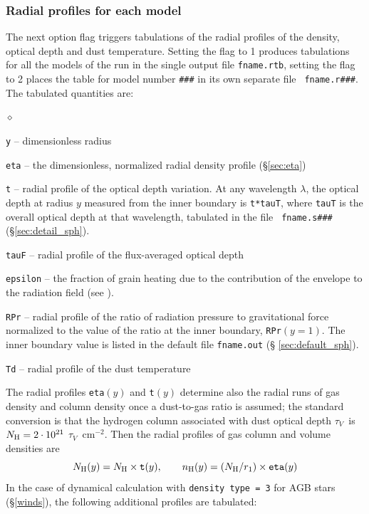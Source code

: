 \documentclass[11pt]{article}
\def\E#1{\hbox{$10^{#1}$}}
\def\tV     {\hbox{$\tau_V$}}
\begin{document}
\subsubsection{Radial profiles for each model}
\label{sec:radial_sph}

The next option flag triggers tabulations of the radial profiles of
the density, optical depth and dust temperature. Setting the flag to 1
produces tabulations for all the models of the run in the single
output file {\tt fname.rtb}, setting the flag to 2 places the table
for model number {\tt \#\#\#} in its own separate file {\tt
  fname.r\#\#\#}. The tabulated quantities are:

\begin{list}{$\diamond$}{}
\item{\tt y} -- dimensionless radius
\item{\tt eta} -- the dimensionless, normalized radial density profile
  (\S \ref{sec:eta})
\item {\tt t} -- radial profile of the optical depth variation.  At
  any wavelength $\lambda$, the optical depth at radius $y$ measured
  from the inner boundary is {\tt t*tauT}, where {\tt tauT} is the
  overall optical depth at that wavelength, tabulated in the file {\tt
    fname.s\#\#\#} (\S \ref{sec:detail_sph}).

\item{\tt tauF} -- radial profile of the flux-averaged optical depth
\item {\tt epsilon} -- the fraction of grain heating due to the
  contribution of the envelope to the radiation field (see
  \cite{IE97}).
\item{\tt RPr} -- radial profile of the ratio of radiation pressure to
  gravitational force normalized to the value of the ratio at the
  inner boundary, {\tt RPr$(y = 1)$}. The inner boundary value is
  listed in the default file {\tt fname.out} (\S
  \ref{sec:default_sph}).
\item{\tt Td} -- radial profile of the dust temperature

\end{list}
The radial profiles {\tt eta}$(y)$ and {\tt t}$(y)$ determine also the
radial runs of gas density and column density once a dust-to-gas ratio
is assumed; the standard conversion is that the hydrogen column
associated with dust optical depth \tV\ is $N_{\rm H} = 2\cdot\E{21}$
\tV\ cm$^{-2}$. Then the radial profiles of gas column and volume
densities are
\begin{equation}\label{eq:profiles}
  N_{\rm H}(y) = N_{\rm H}\times{\tt t}(y), \qquad
  n_{\rm H}(y) = (N_{\rm H}/r_1)\times{\tt eta}(y)
\end{equation}
In the case of dynamical calculation with {\tt density type = 3} for
AGB stars (\S\ref{winds}), the following additional profiles are
tabulated:
\end{document}
